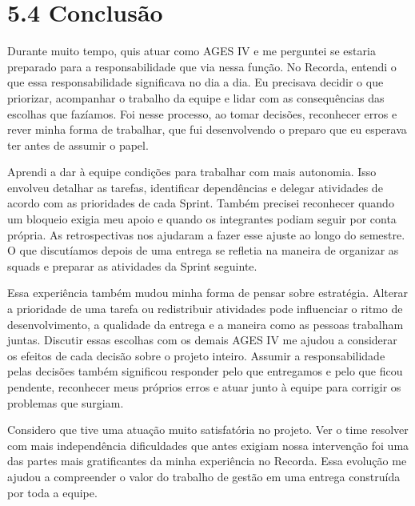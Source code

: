 \hypertarget{__RefHeading___Toc4855_3118176633}{}
\section*{5.4 Conclusão}
\label{ages-iv:text-h-0122}

\indent Durante muito tempo, quis atuar como AGES IV e me perguntei se estaria preparado para a responsabilidade que via nessa função. No Recorda, entendi o que essa responsabilidade significava no dia a dia. Eu precisava decidir o que priorizar, acompanhar o trabalho da equipe e lidar com as consequências das escolhas que fazíamos. Foi nesse processo, ao tomar decisões, reconhecer erros e rever minha forma de trabalhar, que fui desenvolvendo o preparo que eu esperava ter antes de assumir o papel.\par

\indent Aprendi a dar à equipe condições para trabalhar com mais autonomia. Isso envolveu detalhar as tarefas, identificar dependências e delegar atividades de acordo com as prioridades de cada Sprint. Também precisei reconhecer quando um bloqueio exigia meu apoio e quando os integrantes podiam seguir por conta própria. As retrospectivas nos ajudaram a fazer esse ajuste ao longo do semestre. O que discutíamos depois de uma entrega se refletia na maneira de organizar as squads e preparar as atividades da Sprint seguinte.\par

\indent Essa experiência também mudou minha forma de pensar sobre estratégia. Alterar a prioridade de uma tarefa ou redistribuir atividades pode influenciar o ritmo de desenvolvimento, a qualidade da entrega e a maneira como as pessoas trabalham juntas. Discutir essas escolhas com os demais AGES IV me ajudou a considerar os efeitos de cada decisão sobre o projeto inteiro. Assumir a responsabilidade pelas decisões também significou responder pelo que entregamos e pelo que ficou pendente, reconhecer meus próprios erros e atuar junto à equipe para corrigir os problemas que surgiam.\par

\indent Considero que tive uma atuação muito satisfatória no projeto. Ver o time resolver com mais independência dificuldades que antes exigiam nossa intervenção foi uma das partes mais gratificantes da minha experiência no Recorda. Essa evolução me ajudou a compreender o valor do trabalho de gestão em uma entrega construída por toda a equipe.\par

